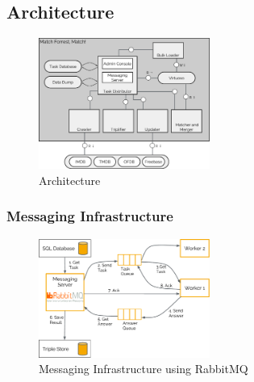 \subsection{Architecture}
\label{subsec_method_architecture}



\begin{figure}[ht]
  \begin{center}
  \includegraphics[width=0.5\textwidth]{images/architecture.pdf}
  \end{center}
  \caption{Architecture}
  \label{fig_architecture}
\end{figure}

\subsubsection{Messaging Infrastructure}
\label{subsubsec_messaging_infrastructure}

\begin{figure}[ht]
  \begin{center}
  \includegraphics[width=0.5\textwidth]{images/rabbit_mq.pdf}
  \end{center}
  \caption{Messaging Infrastructure using RabbitMQ}
  \label{fig_messaging_infrastructure}
\end{figure}
